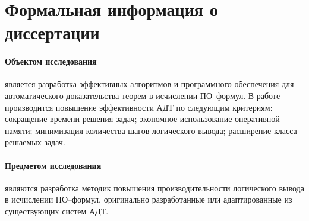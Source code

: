 \section{Формальная информация о диссертации}


\paragraph{Объектом исследования}\hspace{-1em} является разработка эффективных алгоритмов и программного обеспечения для автоматического доказательства теорем в исчислении ПО--формул. В работе производится повышение эффективности АДТ по следующим критериям: сокращение времени решения задач; экономное использование оперативной памяти; минимизация количества шагов логического вывода; расширение класса решаемых задач. %

\paragraph{Предметом исследования}\hspace{-1em} являются разработка методик повышения производительности логического вывода в исчислении ПО--формул, оригинально разработанные или адаптированные из существующих систем АДТ.


